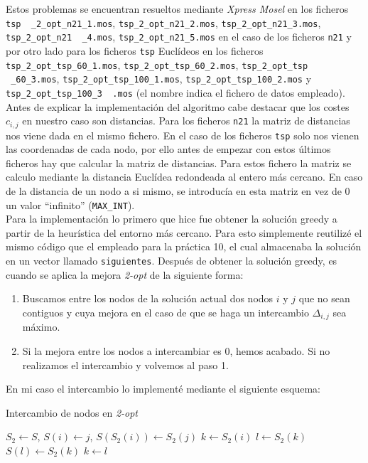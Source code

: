 \documentclass[a4paper,11pt]{article}
\begin{document}
Estos problemas se encuentran resueltos mediante \textit{Xpress Mosel} en los ficheros \texttt{tsp \ \_2\_opt\_n21\_1.mos}, \texttt{tsp\_2\_opt\_n21\_2.mos}, \texttt{tsp\_2\_opt\_n21\_3.mos}, \texttt{tsp\_2\_opt\_n21 \ \_4.mos}, \texttt{tsp\_2\_opt\_n21\_5.mos} en el caso de los ficheros \texttt{n21} y por otro lado para los ficheros \texttt{tsp} Euclídeos en los ficheros \texttt{tsp\_2\_opt\_tsp\_60\_1.mos}, \texttt{tsp\_2\_opt\_tsp\_60\_2.mos}, \texttt{tsp\_2\_opt\_tsp \ \_60\_3.mos}, \texttt{tsp\_2\_opt\_tsp\_100\_1.mos}, \texttt{tsp\_2\_opt\_tsp\_100\_2.mos} y \texttt{tsp\_2\_opt\_tsp\_100\_3 \ .mos} (el nombre indica el fichero de datos empleado).\\

Antes de explicar la implementación del algoritmo cabe destacar que los costes ${c_{i,j}}$ en nuestro caso son distancias. Para los ficheros \texttt{n21} la matriz de distancias nos viene dada en el mismo fichero. En el caso de los ficheros \texttt{tsp} solo nos vienen las coordenadas de cada nodo, por ello antes de empezar con estos últimos ficheros hay que calcular la matriz de distancias. Para estos fichero la matriz se calculo mediante la distancia Euclídea redondeada al entero más cercano. En caso de la distancia de un nodo a si mismo, se introducía en esta matriz en vez de 0 un valor ``infinito'' (\texttt{MAX\_INT}).\\

Para la implementación lo primero que hice fue obtener la solución greedy a partir de la heurística del entorno más cercano. Para esto simplemente reutilizé el mismo código que el empleado para la práctica 10, el cual almacenaba la solución en un vector llamado \texttt{siguientes}. Después de obtener la solución greedy, es cuando se aplica la mejora \textit{2-opt} de la siguiente forma:

\begin{enumerate}
\item Buscamos entre los nodos de la solución actual dos nodos ${i}$ y ${j}$ que no sean contiguos y cuya mejora en el caso de que se haga un intercambio ${\Delta_{i,j}}$ sea máximo.

\item Si la mejora entre los nodos a intercambiar es 0, hemos acabado. Si no realizamos el intercambio y volvemos al paso 1.
\end{enumerate}

En mi caso el intercambio lo implementé mediante el siguiente esquema:

\begin{algorithm}[!htbp]
\caption{Intercambio de nodos en \textit{2-opt}}
\label{alg_entorno_cercano}
\begin{algorithmic}[1]
\State ${S_{2} \gets S}$, ${S(i) \gets j}$, ${S\left( S_{2}(i) \right) \gets S_{2}(j)}$
\State ${k \gets S_{2}(i)}$
    \State ${l \gets S_{2}(k)}$
    \State ${S(l) \gets S_{2}(k)}$
    \State ${k \gets l}$
\EndWhile
\end{algorithmic}
\end{algorithm}
\end{document}
